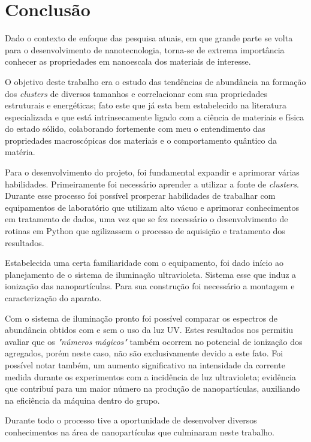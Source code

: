 \chapter{Conclusão}
\label{sec:conclusao}

Dado o contexto de enfoque das pesquisa atuais, em que grande parte se volta para o desenvolvimento de nanotecnologia, torna-se de extrema importância conhecer as propriedades em nanoescala dos materiais de interesse.

O objetivo deste trabalho era o estudo das tendências de abundância na formação dos \textit{clusters} de diversos tamanhos e correlacionar com sua propriedades estruturais e energéticas; fato este que já esta bem estabelecido na literatura especializada e que está intrinsecamente ligado com a ciência de materiais e física do estado sólido, colaborando fortemente com meu o entendimento das propriedades macroscópicas dos materiais e o comportamento quântico da matéria.

Para o desenvolvimento do projeto, foi fundamental expandir e aprimorar várias habilidades. Primeiramente foi necessário aprender a utilizar a fonte de \textit{clusters}. Durante esse processo foi possível prosperar habilidades de trabalhar com equipamentos de laboratório que utilizam alto vácuo e aprimorar conhecimentos em tratamento de dados, uma vez que se fez necessário o desenvolvimento de rotinas em Python que agilizassem o processo de aquisição e tratamento dos resultados.

Estabelecida uma certa familiaridade com o equipamento, foi dado início ao planejamento de o sistema de iluminação ultravioleta. Sistema esse que induz a ionização das nanopartículas. Para sua construção foi necessário a montagem e caracterização do aparato.

Com o sistema de iluminação pronto foi possível comparar os espectros de abundância obtidos com e sem o uso da luz UV. Estes resultados nos permitiu avaliar que os \textit{"números mágicos"} também ocorrem no potencial de ionização dos agregados, porém neste caso, não são exclusivamente devido a este fato. Foi possível notar também, um aumento significativo na intensidade da corrente medida durante os experimentos com a incidência de luz ultravioleta; evidência que contribuí para um maior número na produção de nanopartículas, auxiliando na eficiência da máquina dentro do grupo.

Durante todo o processo tive a oportunidade de desenvolver diversos conhecimentos na área de nanopartículas que culminaram neste trabalho.



